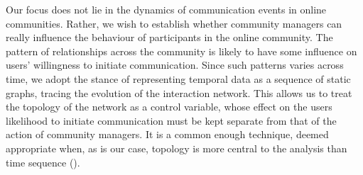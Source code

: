 Our focus does not lie in the dynamics of communication events in online communities. Rather, we wish to establish whether  community managers can really influence the behaviour of participants in the online community. The pattern of relationships across the community is likely to have some influence on users' willingness to initiate communication. Since such patterns varies across time, we adopt the stance of representing temporal data as a sequence of static graphs, tracing the evolution of the interaction network. This allows us to treat the topology of the network as a control variable, whose effect on the users likelihood to initiate communication must be kept separate from that of the action of community managers. It is a common enough technique, deemed appropriate when, as is our case, topology is more central to the analysis than time sequence (\cite{rosvall2010mapping}).
